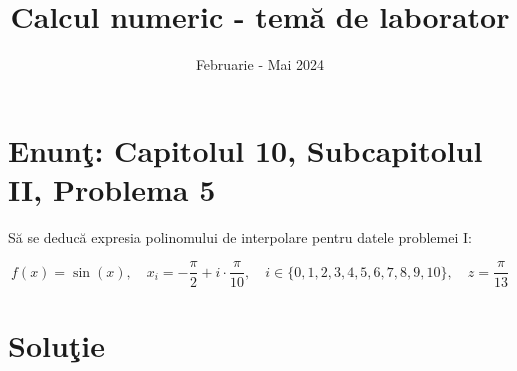 \documentclass{article}
\begin{document}
\title{Calcul numeric - tem\u{a} de laborator}

\author{}

\date{Februarie - Mai 2024}

\maketitle              %








\section*{Enun\c{t}: Capitolul 10, Subcapitolul II, Problema 5}

S\u{a} se deducă expresia polinomului de interpolare pentru datele problemei
I:

\begin{center}
\[
f(x) = \sin(x),
\quad x_i = -\frac{\pi}{2} + i \cdot \frac{\pi}{10},
\quad i \in \{0, 1, 2, 3, 4, 5, 6, 7, 8, 9, 10\},
\quad z = \frac{\pi}{13}
\] 

\end{center}

\section*{Solu\c{t}ie}
\end{document}
